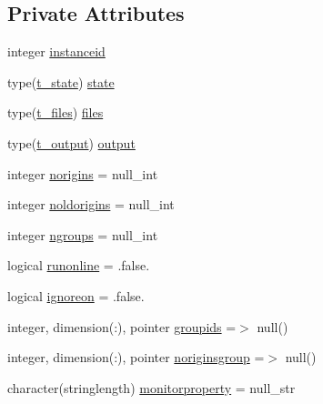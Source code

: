 \subsection*{Private Attributes}
\begin{DoxyCompactItemize}
\item 
integer \mbox{\hyperlink{structmodulelagrangianglobal_1_1t__lagrangian_af6e546641fd0b1b583020e29b3be9cbc}{instanceid}}
\item 
type(\mbox{\hyperlink{structmodulelagrangianglobal_1_1t__state}{t\+\_\+state}}) \mbox{\hyperlink{structmodulelagrangianglobal_1_1t__lagrangian_a2c3a4694f5dd15561c5105e946c45417}{state}}
\item 
type(\mbox{\hyperlink{structmodulelagrangianglobal_1_1t__files}{t\+\_\+files}}) \mbox{\hyperlink{structmodulelagrangianglobal_1_1t__lagrangian_a48855047b374eef12efd932a0901c971}{files}}
\item 
type(\mbox{\hyperlink{structmodulelagrangianglobal_1_1t__output}{t\+\_\+output}}) \mbox{\hyperlink{structmodulelagrangianglobal_1_1t__lagrangian_a2c614bad53f742446d096749dcad71ae}{output}}
\item 
integer \mbox{\hyperlink{structmodulelagrangianglobal_1_1t__lagrangian_a5bb06992febd8e90b9489b1373340d8e}{norigins}} = null\+\_\+int
\item 
integer \mbox{\hyperlink{structmodulelagrangianglobal_1_1t__lagrangian_a615fdb37a381417c903fac8414f14760}{noldorigins}} = null\+\_\+int
\item 
integer \mbox{\hyperlink{structmodulelagrangianglobal_1_1t__lagrangian_a58d520af0fc6af462a8ff07adfc29b03}{ngroups}} = null\+\_\+int
\item 
logical \mbox{\hyperlink{structmodulelagrangianglobal_1_1t__lagrangian_a84c3a505562d46d92b935e57959913a4}{runonline}} = .false.
\item 
logical \mbox{\hyperlink{structmodulelagrangianglobal_1_1t__lagrangian_a269ed6188a7a69f51d579920af85aacb}{ignoreon}} = .false.
\item 
integer, dimension(\+:), pointer \mbox{\hyperlink{structmodulelagrangianglobal_1_1t__lagrangian_a39ec872a4da6811768d9b2bf1eafb1e2}{groupids}} =$>$ null()
\item 
integer, dimension(\+:), pointer \mbox{\hyperlink{structmodulelagrangianglobal_1_1t__lagrangian_a134fc32c8927de64dd4085527c97af26}{noriginsgroup}} =$>$ null()
\item 
character(stringlength) \mbox{\hyperlink{structmodulelagrangianglobal_1_1t__lagrangian_a6fecae8881f26c3e5bf5216b9858452a}{monitorproperty}} = null\+\_\+str

\end{DoxyCompactItemize}
